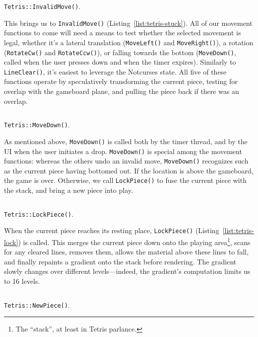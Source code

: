 \begin{listing}[!htb]
\inputminted[]{C}{code-tetris/stuck.h}
\caption{\texttt{Tetris::InvalidMove()}.}
\label{list:tetris-stuck}
\end{listing}

This brings us to \texttt{InvalidMove()} (Listing~\ref{list:tetris-stuck}).
All of our movement functions to come will need a means to test whether the
selected movement is legal, whether it's a lateral translation (\texttt{MoveLeft()}
and \texttt{MoveRight()}), a rotation (\texttt{RotateCw()} and \texttt{RotateCcw()}),
or falling towards the bottom (\texttt{MoveDown()}, called when the user presses
down and when the timer expires). Similarly to \texttt{LineClear()}, it's easiest
to leverage the Notcurses state. All five of these functions operate by speculatively
transforming the current piece, testing for overlap with the gameboard plane,
and pulling the piece back if there was an overlap.

\begin{listing}[!htb]
\inputminted[]{C}{code-tetris/movedown.h}
\caption{\texttt{Tetris::MoveDown()}.}
\label{list:tetris-movedown}
\end{listing}

As mentioned above, \texttt{MoveDown()} is called both by the timer thread,
and by the UI when the user initiates a drop. \texttt{MoveDown()} is special
among the movement functions: whereas the others undo an invalid move,
\texttt{MoveDown()} recognizes such as the current piece having bottomed out.
If the location is above the gameboard, the game is over. Otherwise, we
call \texttt{LockPiece()} to fuse the current piece with the stack, and bring
a new piece into play.

\begin{listing}[!htb]
\inputminted[]{C}{code-tetris/lock.h}
\caption{\texttt{Tetris::LockPiece()}.}
\label{list:tetris-lock}
\end{listing}

When the current piece reaches its resting place, \texttt{LockPiece()} (Listing~\ref{list:tetris-lock})
is called. This merges the current piece down onto the playing area\footnote{The
``stack'', at least in Tetris parlance.}, scans for any cleared lines, removes
them, allows the material above these lines to fall, and finally repaints a
gradient onto the stack before rendering. The gradient slowly changes over
different levels---indeed, the gradient's computation limits us to 16 levels.

\begin{listing}[!htb]
\inputminted[]{C}{code-tetris/newpiece.h}
\caption{\texttt{Tetris::NewPiece()}.}
\label{list:tetris-newpiece}
\end{listing}

